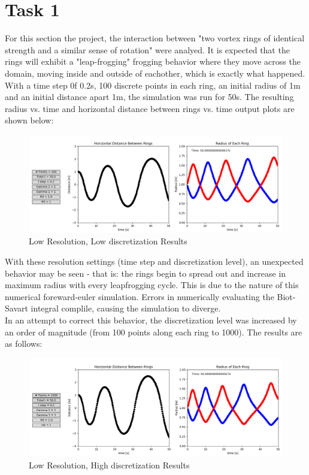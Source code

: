 \documentclass[10pt]{article}
\begin{document}
\section{Task 1}

For this section the project, the interaction between "two vortex rings of identical strength and a similar sense of rotation" were analyed. It is expected that the rings will exhibit a "leap-frogging" frogging behavior where they move across the domain, moving inside and outside of eachother, which is exactly what happened.\\

With a time step 0f 0.2s, 100 discrete points in each ring, an initial radius of 1m and an initial distance apart 1m, the simulation was run for 50s. The resulting radius vs. time and horizontal distance between rings vs. time output plots are shown below:

\begin{figure}[H]
   \centering
   \includegraphics[width=1\linewidth]{figures/task1_coarse_lowD.png}
   \caption{Low Resolution, Low discretization Results}
   \label{task1_coarse_lowD}
\end{figure}


With these resolution settings (time step and discretization level), an unexpected behavior may be seen - that is: the rings begin to spread out and increase in maximum radius with every leapfrogging cycle. This is due to the nature of this numerical foreward-euler simulation. Errors in numerically evaluating the Biot-Savart integral complile, causing the simulation to diverge.\\

In an attempt to correct this behavior, the discretization level was increased by an order of magnitude (from 100 points along each ring to 1000). The results are as follows:


\begin{figure}[H]
   \centering
   \includegraphics[width=1\linewidth]{figures/task1_coarse_highD.png}
   \caption{Low Resolution, High discretization Results}
   \label{task1_coarse_highD}
\end{figure}
\end{document}
